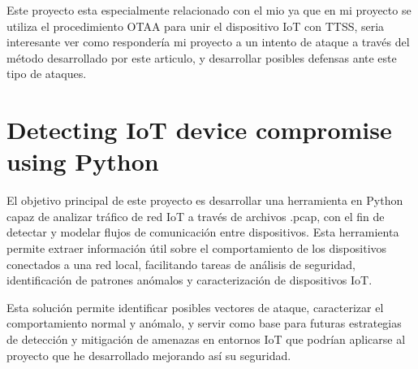 Este proyecto esta especialmente relacionado con el mio ya que en mi proyecto se utiliza el procedimiento OTAA para unir el dispositivo IoT con TTSS, seria interesante ver como respondería mi proyecto a un intento de ataque a través del método desarrollado por este articulo, y desarrollar posibles defensas ante este tipo de ataques.



\section{Detecting IoT device compromise using Python}

El objetivo principal de este proyecto \cite{Rel3} es desarrollar una herramienta en Python capaz de analizar tráfico de red IoT a través de archivos .pcap, con el fin de detectar y modelar flujos de comunicación entre dispositivos. Esta herramienta permite extraer información útil sobre el comportamiento de los dispositivos conectados a una red local, facilitando tareas de análisis de seguridad, identificación de patrones anómalos y caracterización de dispositivos IoT.

 Esta solución permite identificar posibles vectores de ataque, caracterizar el comportamiento normal y anómalo, y servir como base para futuras estrategias de detección y mitigación de amenazas en entornos IoT que podrían aplicarse al proyecto que he desarrollado mejorando así su seguridad. 

 
